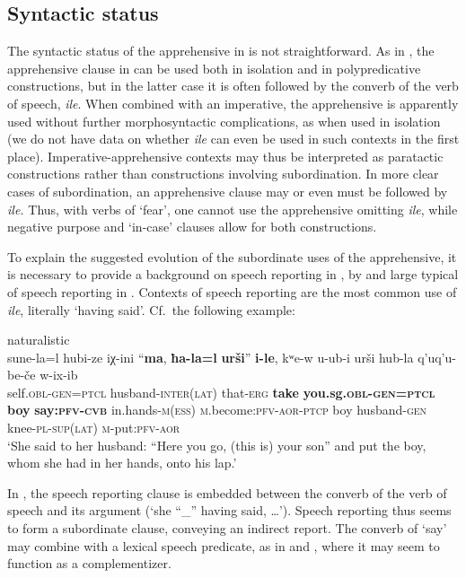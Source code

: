 \documentclass[output=paper,colorlinks,citecolor=brown]{langscibook}
\begin{document}
\subsection{Syntactic status}
\label{Msyntactic}
 \largerpage
The syntactic status of the apprehensive in  is not straightforward. As in , the apprehensive clause in  can be used both in isolation and in polypredicative constructions, but in the latter case it is often followed by the converb of the verb of speech, \textit{ile}. When combined with an imperative, the apprehensive is apparently used without further morphosyntactic complications, as when used in isolation (we do not have data on whether \textit{ile} can even be used in such contexts in the first place). Imperative-apprehensive contexts may thus be interpreted as paratactic constructions rather than constructions involving subordination. In more clear cases of subordination, an apprehensive clause may or even must be followed by \textit{ile.} Thus, with verbs of `fear', one cannot use the apprehensive omitting \textit{ile}, while negative purpose and `in-case' clauses allow for both constructions. 

To explain the suggested evolution of the subordinate uses of the  apprehensive, it is necessary to provide a background on speech reporting in , by and large typical of speech reporting in . Contexts of speech reporting are the most common use of \textit{ile}, literally `having said'. Cf.\ the following example: 
 
\ea \label{ex:DD50} \textnormal{naturalistic}\\
\gll sune-la=l hubi-ze iχ-ini ``\textbf{ma}, \textbf{ħa-la=l} \textbf{urši}'' \textbf{i-le}, kʷe-w u-ub-i urši hub-la q'uq'u-be-če w-ix-ib\\
self.\textsc{obl-gen=ptcl} husband-\textsc{inter(lat)} that-\textsc{erg} \textbf{take} \textbf{you.sg.\textsc{obl-gen=ptcl}} \textbf{boy} \textbf{say:\textsc{pfv-cvb}} in.hands-\textsc{m(ess)}	\textsc{m}.become:\textsc{pfv-aor-ptcp} boy husband-\textsc{gen} knee-\textsc{pl-sup(lat)} \textsc{m}-put:\textsc{pfv-aor}\\
\glt `She said to her husband: ``Here you go, (this is) your son'' and put the boy, whom she had in her hands, onto his lap.'
\z

\noindent In , the speech reporting clause is embedded between the converb of the verb of speech and its argument (`she ``\_'' having said, \ldots'). Speech reporting thus seems to form a subordinate clause, conveying an indirect report. The converb of `say' may combine with a lexical speech predicate, as in  and , where it may seem to function as a complementizer.
\end{document}
